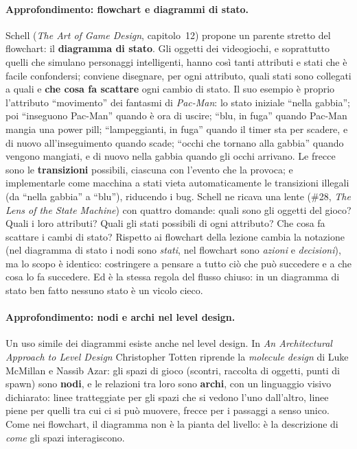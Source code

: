 \paragraph{Approfondimento: flowchart e diagrammi di stato.} Schell
(\emph{The Art of Game Design}, capitolo~12) propone un parente stretto del
flowchart: il \textbf{diagramma di stato}. Gli oggetti dei videogiochi, e
soprattutto quelli che simulano personaggi intelligenti, hanno così tanti
attributi e stati che è facile confondersi; conviene disegnare, per ogni
attributo, quali stati sono collegati a quali e \textbf{che cosa fa scattare}
ogni cambio di stato. Il suo esempio è proprio l'attributo ``movimento'' dei
fantasmi di \emph{Pac-Man}: lo stato iniziale ``nella gabbia''; poi
``inseguono Pac-Man'' quando è ora di uscire; ``blu, in fuga'' quando
Pac-Man mangia una power pill; ``lampeggianti, in fuga'' quando il timer sta
per scadere, e di nuovo all'inseguimento quando scade; ``occhi che tornano
alla gabbia'' quando vengono mangiati, e di nuovo nella gabbia quando gli
occhi arrivano. Le frecce sono le \textbf{transizioni} possibili, ciascuna con
l'evento che la provoca; e implementarle come macchina a stati vieta
automaticamente le transizioni illegali (da ``nella gabbia'' a ``blu''),
riducendo i bug. Schell ne ricava una lente (\#28, \emph{The Lens of the
State Machine}) con quattro domande: quali sono gli oggetti del gioco? Quali
i loro attributi? Quali gli stati possibili di ogni attributo? Che cosa fa
scattare i cambi di stato? Rispetto ai flowchart della lezione cambia la
notazione (nel diagramma di stato i nodi sono \emph{stati}, nel flowchart
sono \emph{azioni} e \emph{decisioni}), ma lo scopo è identico: costringere a
pensare a tutto ciò che può succedere e a che cosa lo fa succedere. Ed è la
stessa regola del flusso chiuso: in un diagramma di stato ben fatto nessuno
stato è un vicolo cieco.

\paragraph{Approfondimento: nodi e archi nel level design.} Un uso simile dei
diagrammi esiste anche nel level design. In \emph{An Architectural Approach
to Level Design} Christopher Totten riprende la \emph{molecule design} di
Luke McMillan e Nassib Azar: gli spazi di gioco (scontri, raccolta di
oggetti, punti di spawn) sono \textbf{nodi}, e le relazioni tra loro sono
\textbf{archi}, con un linguaggio visivo dichiarato: linee tratteggiate per
gli spazi che si vedono l'uno dall'altro, linee piene per quelli tra cui ci si
può muovere, frecce per i passaggi a senso unico. Come nei flowchart, il
diagramma non è la pianta del livello: è la descrizione di \emph{come} gli
spazi interagiscono.

